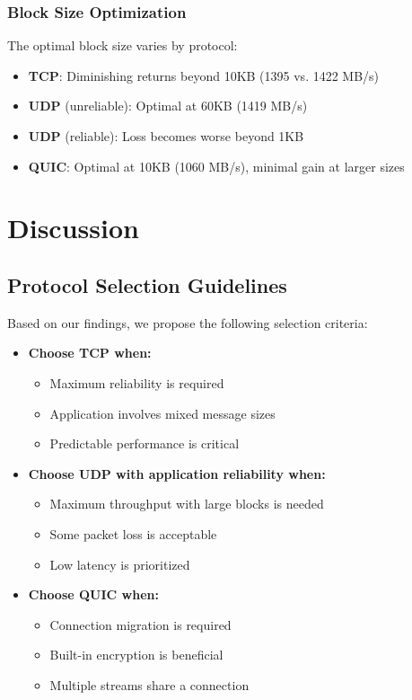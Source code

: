 \documentclass[12pt,a4paper]{article}
\begin{document}
\subsubsection{Block Size Optimization}
The optimal block size varies by protocol:
\begin{itemize}
    \item \textbf{TCP}: Diminishing returns beyond 10KB (1395 vs. 1422 MB/s)
    \item \textbf{UDP} (unreliable): Optimal at 60KB (1419 MB/s)
    \item \textbf{UDP} (reliable): Loss becomes worse beyond 1KB
    \item \textbf{QUIC}: Optimal at 10KB (1060 MB/s), minimal gain at larger sizes
\end{itemize}

\section{Discussion}

\subsection{Protocol Selection Guidelines}

Based on our findings, we propose the following selection criteria:

\begin{itemize}
    \item \textbf{Choose TCP when:}
    \begin{itemize}
        \item Maximum reliability is required
        \item Application involves mixed message sizes
        \item Predictable performance is critical
    \end{itemize}
    
    \item \textbf{Choose UDP with application reliability when:}
    \begin{itemize}
        \item Maximum throughput with large blocks is needed
        \item Some packet loss is acceptable
        \item Low latency is prioritized
    \end{itemize}
    
    \item \textbf{Choose QUIC when:}
    \begin{itemize}
        \item Connection migration is required
        \item Built-in encryption is beneficial
        \item Multiple streams share a connection
    \end{itemize}
\end{itemize}
\end{document}
